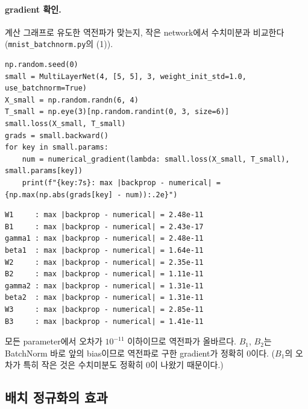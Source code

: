 \documentclass[11pt,a4paper]{article}
\begin{document}
\paragraph{gradient 확인.}
계산 그래프로 유도한 역전파가 맞는지, 작은 network에서 수치미분과 비교한다
(\texttt{mnist\_batchnorm.py}의 (1)).
\begin{lstlisting}
np.random.seed(0)
small = MultiLayerNet(4, [5, 5], 3, weight_init_std=1.0, use_batchnorm=True)
X_small = np.random.randn(6, 4)
T_small = np.eye(3)[np.random.randint(0, 3, size=6)]
small.loss(X_small, T_small)
grads = small.backward()
for key in small.params:
    num = numerical_gradient(lambda: small.loss(X_small, T_small), small.params[key])
    print(f"{key:7s}: max |backprop - numerical| = {np.max(np.abs(grads[key] - num)):.2e}")
\end{lstlisting}
\begin{lstlisting}[language={},numbers=none]
W1     : max |backprop - numerical| = 2.48e-11
B1     : max |backprop - numerical| = 2.43e-17
gamma1 : max |backprop - numerical| = 2.48e-11
beta1  : max |backprop - numerical| = 1.64e-11
W2     : max |backprop - numerical| = 2.35e-11
B2     : max |backprop - numerical| = 1.11e-11
gamma2 : max |backprop - numerical| = 1.31e-11
beta2  : max |backprop - numerical| = 1.31e-11
W3     : max |backprop - numerical| = 2.85e-11
B3     : max |backprop - numerical| = 1.41e-11
\end{lstlisting}
모든 parameter에서 오차가 $10^{-11}$ 이하이므로 역전파가 올바르다.
$B_1$, $B_2$는 BatchNorm 바로 앞의 bias이므로 역전파로 구한 gradient가 정확히 $0$이다.
($B_1$의 오차가 특히 작은 것은 수치미분도 정확히 $0$이 나왔기 때문이다.)

\subsection{배치 정규화의 효과}\label{sec:bneffect}
\end{document}
